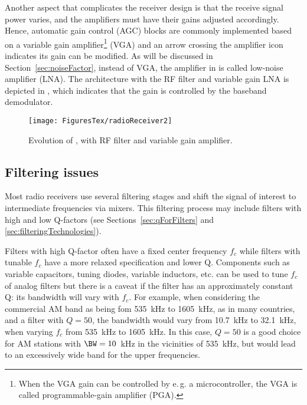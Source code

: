Another aspect that complicates the receiver design is that the receive signal power varies, and the amplifiers must have their gains adjusted accordingly. Hence, automatic gain control (AGC) blocks are commonly implemented based on a variable gain amplifier\footnote{When the VGA gain can be controlled by e.\,g. a microcontroller, the VGA is called programmable-gain amplifier (PGA).} (VGA) and an arrow crossing the amplifier icon indicates its gain can be modified. 
As will be discussed in Section~\ref{sec:noiseFactor}, instead of VGA, the amplifier in  is called low-noise amplifier (LNA).
The architecture with the RF filter and variable gain LNA is depicted in , which indicates that the gain is controlled by the baseband demodulator.

\begin{figure}[htbp]
	\centering
		\texttt{[image: FiguresTex/radioReceiver2]}		
	\caption{Evolution of , with RF filter and variable gain amplifier.\label{fig:radioReceiver2}}
\end{figure}

\subsection{Filtering issues}

Most radio receivers use several filtering stages and shift the signal of interest to intermediate frequencies via mixers. This filtering process may include filters with high and low Q-factors (see Sections~\ref{sec:qForFilters} and \ref{sec:filteringTechnologies}).

Filters with high Q-factor often have a fixed center frequency $f_c$ while filters with tunable $f_c$ have a more relaxed specification and lower Q.
Components such as variable capacitors, tuning diodes, variable inductors, etc. can be used to tune $f_c$ of analog filters but there is a caveat if the filter has an approximately constant Q: its bandwidth will vary with $f_c$. For example, when considering the commercial AM band as being fom 535~kHz to 1605~kHz, as in many countries, and a filter with $Q=50$, the bandwidth would vary from 10.7~kHz to 32.1~kHz, when varying $f_c$ from 535~kHz to 1605~kHz. In this case, $Q=50$ is a good choice for AM stations with $\BW=10$~kHz in the vicinities of 535~kHz, but would lead to an excessively wide band for the upper frequencies.

